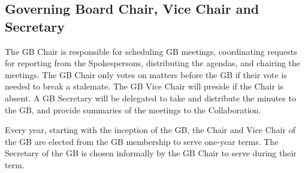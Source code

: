 \documentclass[12pt]{article}
\newcommand{\Comment}[1]{\textcolor{Blue}{(Comment: #1)}}
\begin{document}



\subsection{Governing Board Chair, Vice Chair and Secretary}

The GB Chair is responsible for scheduling GB meetings, coordinating requests for reporting from the Spokespersons, distributing the agendas, and chairing the meetings.  The GB Chair only votes on matters before the GB if their vote is needed to break a stalemate.  The GB Vice Chair will preside if the Chair is absent. A GB Secretary will be delegated to take and distribute the minutes to the GB, and provide summaries of the meetings to the Collaboration.   

Every year, starting with the inception of the GB, the Chair and Vice Chair of the GB are elected from the GB membership to serve one-year terms. 
The Secretary of the GB is chosen informally by the GB Chair to serve during their term. %
\end{document}
